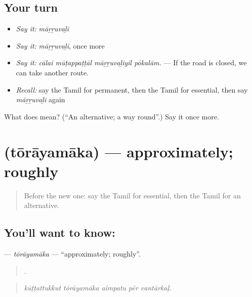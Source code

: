\subsection*{Your turn}
\begin{itemize}
\raggedright
  \item \emph{Say it:} \emph{māṟṟuvaḻi}
  \item \emph{Say it:} \emph{māṟṟuvaḻi}, once more
  \item \emph{Say it:} \emph{cālai mūṭappaṭṭāl māṟṟuvaḻiyil pōkalām.} — If the road is closed, we can take another route.
  \item \emph{Recall:} say the Tamil for permanent, then the Tamil for essential, then say \emph{māṟṟuvaḻi} again
\end{itemize}

\begin{tcolorbox}[breakable,colback=teal!4,colframe=teal!35!black,title={Before you move on}]
What does  mean? (\textquotedblleft{}An alternative; a way round\textquotedblright{}.) Say it once more.
\end{tcolorbox}
\section[\texorpdfstring{\ta{தோராயமாக} (tōrāyamāka)}{தோராயமாக (tōrāyamāka)}]{ (tōrāyamāka) — approximately; roughly}

\label{lesson:TA-C553-torayamaka}



\begin{quote}
Before the new one: say the Tamil for essential, then the Tamil for an alternative.
\end{quote}

\subsection*{You'll want to know: }
\textbf{} — \emph{tōrāyamāka} — \textquotedblleft{}approximately; roughly\textquotedblright{}.

\begin{quote}
    .
\end{quote}

\begin{quote}
\emph{kūṭṭattukkut tōrāyamāka aimpatu pēr vantārkaḷ.}
\end{quote}

